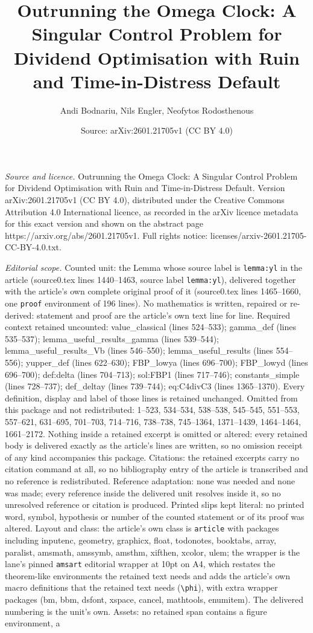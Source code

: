 \documentclass[10pt,a4paper]{amsart}
\title[Outrunning the Omega Clock: A Singular Control Problem for D]{Outrunning the Omega Clock: A Singular Control Problem for Dividend Optimisation with Ruin and Time-in-Distress Default}
\author{Andi Bodnariu, Nils Engler, Neofytos Rodosthenous}
\date{Source: arXiv:2601.21705v1 (CC BY 4.0)}
\begin{document}
\maketitle

\noindent\emph{Source and licence.} Outrunning the Omega Clock: A Singular Control Problem for Dividend Optimisation with Ruin and Time-in-Distress Default. Version arXiv:2601.21705v1 (CC BY 4.0), distributed under the Creative Commons Attribution 4.0 International licence, as recorded in the arXiv licence metadata for this exact version and shown on the abstract page https://arxiv.org/abs/2601.21705v1. Full rights notice: licenses/arxiv-2601.21705-CC-BY-4.0.txt.\par\smallskip

\noindent\textit{Editorial scope.} Counted unit: the Lemma whose source label is \texttt{lemma:yl} in the article (source0.tex lines 1440--1463, source label \texttt{lemma:yl}), delivered together with the article's own complete original proof of it (source0.tex lines 1465--1660, one \texttt{proof} environment of 196 lines). No mathematics is written, repaired or re-derived: statement and proof are the article's own text line for line. Required context retained uncounted: value\_classical (lines 524--533); gamma\_def (lines 535--537); lemma\_useful\_results\_gamma (lines 539--544); lemma\_useful\_results\_Vb (lines 546--550); lemma\_useful\_results (lines 554--556); yupper\_def (lines 622--630); FBP\_lowya (lines 696--700); FBP\_lowyd (lines 696--700); def:delta (lines 704--713); sol:FBP1 (lines 717--746); constants\_simple (lines 728--737); def\_deltay (lines 739--744); eq:C4divC3 (lines 1365--1370). Every definition, display and label of those lines is retained unchanged. Omitted from this package and not redistributed: 1--523, 534--534, 538--538, 545--545, 551--553, 557--621, 631--695, 701--703, 714--716, 738--738, 745--1364, 1371--1439, 1464--1464, 1661--2172. Nothing inside a retained excerpt is omitted or altered: every retained body is delivered exactly as the article's lines are written, so no omission receipt of any kind accompanies this package. Citations: the retained excerpts carry no citation command at all, so no bibliography entry of the article is transcribed and no reference is redistributed. Reference adaptation: none was needed and none was made; every reference inside the delivered unit resolves inside it, so no unresolved reference or citation is produced. Printed slips kept literal: no printed word, symbol, hypothesis or number of the counted statement or of its proof was altered. Layout and class: the article's own class is \texttt{article} with packages including inputenc, geometry, graphicx, float, todonotes, booktabs, array, paralist, amsmath, amssymb, amsthm, xifthen, xcolor, ulem; the wrapper is the lane's pinned \texttt{amsart} editorial wrapper at 10pt on A4, which restates the theorem-like environments the retained text needs and adds the article's own macro definitions that the retained text needs (\texttt{\textbackslash phi}), with extra wrapper packages (bm, bbm, dsfont, xspace, cancel, mathtools, enumitem). The delivered numbering is the unit's own. Assets: no retained span contains a figure environment, a 
\end{document}
